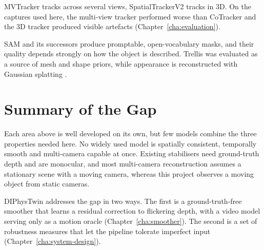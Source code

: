 MVTracker \parencite{mvtracker} tracks across several views, SpatialTrackerV2
\parencite{spatrackerv2} tracks in 3D. On the captures used here, the multi-view tracker performed worse than CoTracker and
the 3D tracker produced visible artefacts (Chapter~\ref{cha:evaluation}).

\label{sec:bg-reconstruction}

SAM and its successors \parencite{sam,sam3,groundedsam} produce promptable, open-vocabulary
masks, and their quality depends strongly on how the object is described. Trellis
\parencite{trellis} was evaluated as a source of mesh and shape priors, while appearance is
reconstructed with Gaussian splatting \parencite{gaussiansplatting}.

\section{Summary of the Gap}
\label{sec:bg-gap}

Each area above is well developed on its own, but few models combine the three properties needed here. No widely used
model is spatially consistent, temporally smooth and multi-camera capable at once. Existing
stabilisers need ground-truth depth and are monocular, and most multi-camera reconstruction
assumes a stationary scene with a moving camera, whereas this project observes a moving object
from static cameras.

DIPhysTwin addresses the gap in two ways. The first is a ground-truth-free smoother that
learns a residual correction to flickering depth, with a video model serving only as a motion
oracle (Chapter~\ref{cha:smoother}). The second is a set of robustness measures that let the
pipeline tolerate imperfect input (Chapter~\ref{cha:system-design}).
